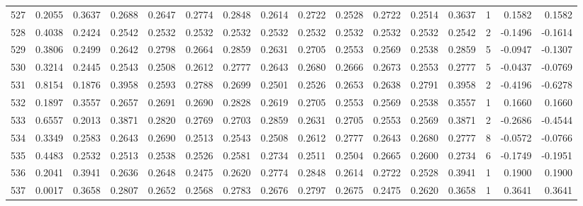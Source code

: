 \begin{tabular}{lrrrrrrrrrrrrrrr}
527 &      0.2055 &  0.3637 &  0.2688 &  0.2647 &  0.2774 &  0.2848 &  0.2614 &  0.2722 &  0.2528 &  0.2722 &   0.2514 &     0.3637 &      1 &                    0.1582 &                     0.1582 \\
528 &      0.4038 &  0.2424 &  0.2542 &  0.2532 &  0.2532 &  0.2532 &  0.2532 &  0.2532 &  0.2532 &  0.2532 &   0.2532 &     0.2542 &      2 &                   -0.1496 &                    -0.1614 \\
529 &      0.3806 &  0.2499 &  0.2642 &  0.2798 &  0.2664 &  0.2859 &  0.2631 &  0.2705 &  0.2553 &  0.2569 &   0.2538 &     0.2859 &      5 &                   -0.0947 &                    -0.1307 \\
530 &      0.3214 &  0.2445 &  0.2543 &  0.2508 &  0.2612 &  0.2777 &  0.2643 &  0.2680 &  0.2666 &  0.2673 &   0.2553 &     0.2777 &      5 &                   -0.0437 &                    -0.0769 \\
531 &      0.8154 &  0.1876 &  0.3958 &  0.2593 &  0.2788 &  0.2699 &  0.2501 &  0.2526 &  0.2653 &  0.2638 &   0.2791 &     0.3958 &      2 &                   -0.4196 &                    -0.6278 \\
532 &      0.1897 &  0.3557 &  0.2657 &  0.2691 &  0.2690 &  0.2828 &  0.2619 &  0.2705 &  0.2553 &  0.2569 &   0.2538 &     0.3557 &      1 &                    0.1660 &                     0.1660 \\
533 &      0.6557 &  0.2013 &  0.3871 &  0.2820 &  0.2769 &  0.2703 &  0.2859 &  0.2631 &  0.2705 &  0.2553 &   0.2569 &     0.3871 &      2 &                   -0.2686 &                    -0.4544 \\
534 &      0.3349 &  0.2583 &  0.2643 &  0.2690 &  0.2513 &  0.2543 &  0.2508 &  0.2612 &  0.2777 &  0.2643 &   0.2680 &     0.2777 &      8 &                   -0.0572 &                    -0.0766 \\
535 &      0.4483 &  0.2532 &  0.2513 &  0.2538 &  0.2526 &  0.2581 &  0.2734 &  0.2511 &  0.2504 &  0.2665 &   0.2600 &     0.2734 &      6 &                   -0.1749 &                    -0.1951 \\
536 &      0.2041 &  0.3941 &  0.2636 &  0.2648 &  0.2475 &  0.2620 &  0.2774 &  0.2848 &  0.2614 &  0.2722 &   0.2528 &     0.3941 &      1 &                    0.1900 &                     0.1900 \\
537 &      0.0017 &  0.3658 &  0.2807 &  0.2652 &  0.2568 &  0.2783 &  0.2676 &  0.2797 &  0.2675 &  0.2475 &   0.2620 &     0.3658 &      1 &                    0.3641 &                     0.3641 \\

\end{tabular}
